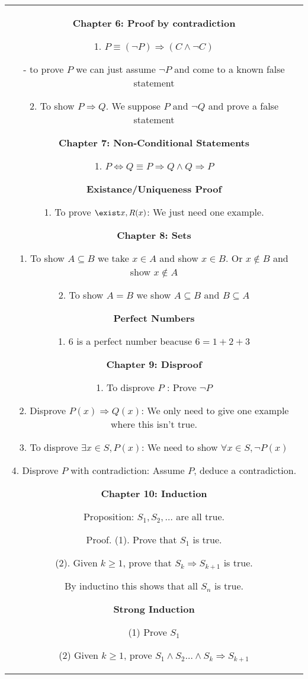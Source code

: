 \documentclass[a4paper]{article}
\begin{document}
    \begin{tabular}{@{}c@{}}
    \begin{minipage}[t][\paperheight][t]{0.5\paperwidth}%
        \textbf{Chapter 6: Proof by contradiction}

        1. $P \equiv (\neg P) \Rightarrow (C \land \neg C)$ 
        
        \quad - to prove $P$ we can just assume $\neg P$ and come to a known false statement

        2. To show $P \Rightarrow Q$. We suppose  $P$ and  $\neg Q$ and prove a false statement

        \textbf{Chapter 7: Non-Conditional Statements}

        1. $P \iff Q \equiv P \Rightarrow Q \land Q \Rightarrow P$

        \textbf{Existance/Uniqueness Proof}

        1. To prove $\exist x, R(x)$: We just need one example.
        
        \textbf{Chapter 8: Sets}

        1. To show $A \subseteq B$ we take $x \in A$ and show  $x \in B$. Or  $x \notin B$ and show  $x \notin A$ 

        2. To show $A = B$ we show  $A \subseteq B$ and  $B \subseteq A$

        \textbf{Perfect Numbers}

        1. 6 is a perfect number beacuse  $6 = 1 + 2 + 3$

        \textbf{Chapter 9: Disproof}

        1. To disprove  $P$ : Prove $\neg P$

        2. Disprove  $P(x) \Rightarrow Q(x)$: We only need to give one example where this isn't true.

        3. To disprove  $\exists x \in S, P(x)$: We need to show  $\forall x \in S, \neg P(x)$

        4. Disprove  $P$ with contradiction: Assume $P$, deduce a contradiction.

        \textbf{Chapter 10: Induction}

        Proposition: $S_1,S_2,\dots$ are all true.

        Proof. (1). Prove that $S_1$ is true.

        (2). Given $k \ge 1$, prove that  $S_k \Rightarrow S_{k+1}$ is true.

        By inductino this shows that all $S_n$ is true.

        \textbf{Strong Induction}

        (1) Prove $S_1$

        (2) Given $k \ge 1$, prove  $S_1\land S_2 \dots \land S_k \Rightarrow S_{k + 1}$  




    \end{minipage}%
    \end{tabular}%
\end{document}
